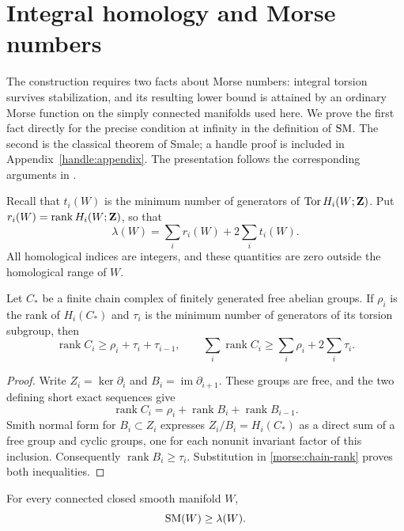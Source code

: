 \section{Integral homology and Morse numbers}\label{morse:section}\label{sec:morse}

The construction requires two facts about Morse numbers: integral torsion
survives stabilization, and its resulting lower bound is attained by an
ordinary Morse function on the simply connected manifolds used here.
We prove the first fact directly for the precise condition at infinity
in the definition of $\operatorname{SM}$.  The second is the classical theorem of
Smale; a handle proof is included in Appendix~\ref{handle:appendix}.
The presentation follows the corresponding arguments in
\cite[Section~2 and Appendix~A]{OpenAICompanion}.

Recall that $t_i(W)$ is the minimum number of generators of
$\operatorname{Tor} H_i(W;\mathbf Z)$.  Put $r_i(W)=\operatorname{rank}H_i(W;\mathbf Z)$, so that
\[
 \lambda(W)=\sum_i r_i(W)+2\sum_i t_i(W).
\]
All homological indices are integers, and these quantities are zero
outside the homological range of $W$.

\begin{lemma}\label{morse:chain-bound}
Let $C_*$ be a finite chain complex of finitely generated free abelian
groups.  If $\rho_i$ is the rank of $H_i(C_*)$ and $\tau_i$ is the
minimum number of generators of its torsion subgroup, then
\[
 \operatorname{rank}C_i\geq\rho_i+\tau_i+\tau_{i-1},
 \qquad
 \sum_i\operatorname{rank}C_i\geq\sum_i\rho_i+2\sum_i\tau_i.
\]
\end{lemma}

\begin{proof}
Write $Z_i=\ker\partial_i$ and $B_i=\operatorname{im}\partial_{i+1}$.
These groups are free, and the two defining short exact sequences give
\begin{equation}\label{morse:chain-rank}
 \operatorname{rank}C_i
 =\rho_i+\operatorname{rank}B_i+\operatorname{rank}B_{i-1}.
\end{equation}
Smith normal form for $B_i\subset Z_i$ expresses
$Z_i/B_i=H_i(C_*)$ as a direct sum of a free group and cyclic groups,
one for each nonunit invariant factor of this inclusion.
Consequently $\operatorname{rank}B_i\geq\tau_i$.
Substitution in \eqref{morse:chain-rank} proves both inequalities.
\end{proof}

\begin{proposition}\label{morse:stable-lower}
For every connected closed smooth manifold $W$,
\[
 \operatorname{SM}(W)\geq\lambda(W).
\]
\end{proposition}

